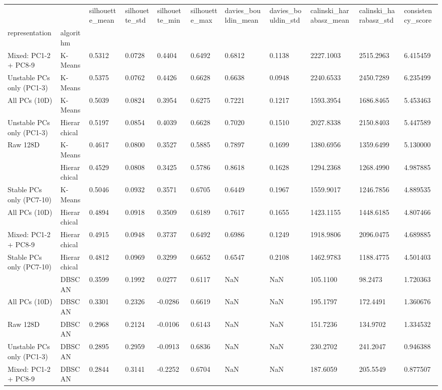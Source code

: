 \documentclass[
  letterpaper,
  DIV=11,
  numbers=noendperiod]{scrartcl}
\begin{document}
\begin{longtable}[]{@{}lllllllllll@{}}
\toprule\noalign{}
& & silhouette\_mean & silhouette\_std & silhouette\_min &
silhouette\_max & davies\_bouldin\_mean & davies\_bouldin\_std &
calinski\_harabasz\_mean & calinski\_harabasz\_std &
consistency\_score \\
representation & algorithm & & & & & & & & & \\
\midrule\noalign{}
\endhead
\bottomrule\noalign{}
\endlastfoot
Mixed: PC1-2 + PC8-9 & K-Means & 0.5312 & 0.0728 & 0.4404 & 0.6492 &
0.6812 & 0.1138 & 2227.1003 & 2515.2963 & 6.415459 \\
Unstable PCs only (PC1-3) & K-Means & 0.5375 & 0.0762 & 0.4426 & 0.6628
& 0.6638 & 0.0948 & 2240.6533 & 2450.7289 & 6.235499 \\
All PCs (10D) & K-Means & 0.5039 & 0.0824 & 0.3954 & 0.6275 & 0.7221 &
0.1217 & 1593.3954 & 1686.8465 & 5.453463 \\
Unstable PCs only (PC1-3) & Hierarchical & 0.5197 & 0.0854 & 0.4039 &
0.6628 & 0.7020 & 0.1510 & 2027.8338 & 2150.8403 & 5.447589 \\
\multirow{2}{=}{Raw 128D} & K-Means & 0.4617 & 0.0800 & 0.3527 & 0.5885
& 0.7897 & 0.1699 & 1380.6956 & 1359.6499 & 5.130000 \\
& Hierarchical & 0.4529 & 0.0808 & 0.3425 & 0.5786 & 0.8618 & 0.1628 &
1294.2368 & 1268.4990 & 4.987885 \\
Stable PCs only (PC7-10) & K-Means & 0.5046 & 0.0932 & 0.3571 & 0.6705 &
0.6449 & 0.1967 & 1559.9017 & 1246.7856 & 4.889535 \\
All PCs (10D) & Hierarchical & 0.4894 & 0.0918 & 0.3509 & 0.6189 &
0.7617 & 0.1655 & 1423.1155 & 1448.6185 & 4.807466 \\
Mixed: PC1-2 + PC8-9 & Hierarchical & 0.4915 & 0.0948 & 0.3737 & 0.6492
& 0.6986 & 0.1249 & 1918.9806 & 2096.0475 & 4.689885 \\
\multirow{2}{=}{Stable PCs only (PC7-10)} & Hierarchical & 0.4812 &
0.0969 & 0.3299 & 0.6652 & 0.6547 & 0.2108 & 1462.9783 & 1188.4775 &
4.501403 \\
& DBSCAN & 0.3599 & 0.1992 & 0.0277 & 0.6117 & NaN & NaN & 105.1100 &
98.2473 & 1.720363 \\
All PCs (10D) & DBSCAN & 0.3301 & 0.2326 & -0.0286 & 0.6619 & NaN & NaN
& 195.1797 & 172.4491 & 1.360676 \\
Raw 128D & DBSCAN & 0.2968 & 0.2124 & -0.0106 & 0.6143 & NaN & NaN &
151.7236 & 134.9702 & 1.334532 \\
Unstable PCs only (PC1-3) & DBSCAN & 0.2895 & 0.2959 & -0.0913 & 0.6836
& NaN & NaN & 230.2702 & 241.2047 & 0.946388 \\
Mixed: PC1-2 + PC8-9 & DBSCAN & 0.2844 & 0.3141 & -0.2252 & 0.6704 & NaN
& NaN & 187.6059 & 205.5549 & 0.877507 \\
\end{longtable}
\end{document}
